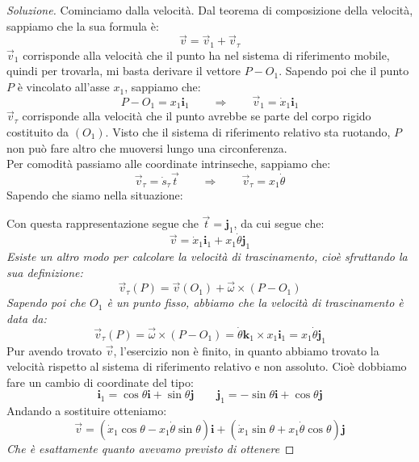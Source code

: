 \documentclass[11pt,a4paper,twoside]{article}
\theoremstyle{definition}
\newenvironment{sol}
	{\renewcommand\qedsymbol{$\blacksquare$}\begin{proof}[Soluzione]}
	{\end{proof}}
\begin{document}
\begin{sol}
	Cominciamo dalla velocità. Dal teorema di composizione della velocità, sappiamo che la sua formula è:
	\[ \vec v = \vec v_1 + \vec v_\tau \]
	$\vec v_1$ corrisponde alla velocità che il punto ha nel sistema di riferimento mobile, quindi per trovarla, mi basta derivare il vettore $P-O_1$. Sapendo poi che il punto $P$ è vincolato all'asse $x_1$, sappiamo che:
	\[ P-O_1 = x_1\mathbf i_1 \qquad \Rightarrow \qquad \vec v_1 = \dot x_1 \mathbf i_1\]
	$\vec v_\tau$ corrisponde alla velocità che il punto avrebbe se parte del corpo rigido costituito da $(O_1)$. Visto che il sistema di riferimento relativo sta ruotando, $P$ non può fare altro che muoversi lungo una circonferenza.\\
	Per comodità passiamo alle coordinate intrinseche, sappiamo che:
	\[ \vec v_\tau = \dot s_\tau \vec t\qquad \Rightarrow \qquad \vec v_\tau = x_1 \dot \theta \]
	Sapendo che siamo nella situazione:
	\begin{center}
	\end{center}
	Con questa rappresentazione segue che $\vec t = \mathbf j_1$, da cui segue che:
	\[ \vec v = \dot x_1 \mathbf i_1 + x_1 \dot \theta \mathbf j_1 \]
	\textit{Esiste un altro modo per calcolare la velocità di trascinamento, cioè sfruttando la sua definizione:
	\[ \vec v_\tau(P) = \vec v(O_1) + \vec \omega \times (P-O_1) \]
	Sapendo poi che $O_1$ è un punto fisso, abbiamo che la velocità di trascinamento è data da:}
	\[\vec v_\tau (P) = \vec \omega \times (P-O_1) = \dot \theta \mathbf k_1 \times x_1 \mathbf i_1 = x_1 \dot\theta \mathbf j_1\]
	Pur avendo trovato $\vec v$, l'esercizio non è finito, in quanto abbiamo trovato la velocità rispetto al sistema di riferimento relativo e non assoluto. Cioè dobbiamo fare un cambio di coordinate del tipo:
	\[ \mathbf i_1 = \cos \theta \mathbf i + \sin \theta \mathbf j \qquad \mathbf j_1 = - \sin \theta \mathbf i + \cos \theta \mathbf j\]
	Andando a sostituire otteniamo:
	\[ \vec v = (\dot x_1 \cos \theta - x_1 \dot \theta \sin \theta)\mathbf i + (\dot x_1 \sin \theta + x_1 \dot \theta \cos \theta)\mathbf j \]
	\textit{Che è esattamente quanto avevamo previsto di ottenere}


\end{sol}
\end{document}
